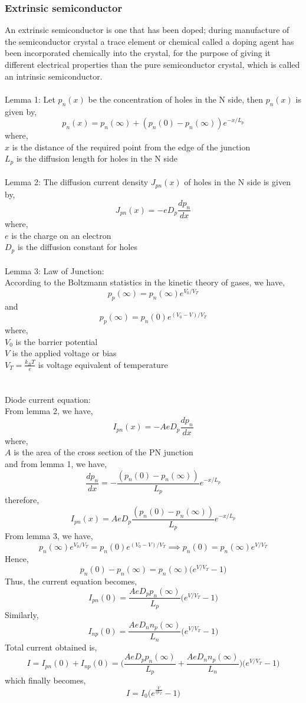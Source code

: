 \documentclass[12pt]{article}
\begin{document}
\subsubsection*{Extrinsic semiconductor}
An extrinsic semiconductor is one that has been doped; during manufacture of the semiconductor crystal a trace element or chemical called a doping agent has been incorporated chemically into the crystal, for the purpose of giving it different electrical properties than the pure semiconductor crystal, which is called an intrinsic semiconductor.\\ \\
Lemma 1: Let $p_n(x)$ be the concentration of holes in the N side, then $p_n(x)$ is given by,
$$p_n(x) = p_n(\infty) + (p_n(0) - p_n(\infty))e^{-x/L_p}$$
where,\\
$x$ is the distance of the required point from the edge of the junction\\
$L_p$ is the diffusion length for holes in the N side\\ \\
Lemma 2: The diffusion current density $J_{pn}(x)$ of holes in the N side is given by,
$$J_{pn}(x) = -eD_p\frac{dp_n}{dx}$$
where,\\
$e$ is the charge on an electron\\
$D_p$ is the diffusion constant for holes\\ \\
Lemma 3: Law of Junction:\\
According to the Boltzmann statistics in the kinetic theory of gases, we have,
$$p_p(\infty) = p_n(\infty)e^{V_0/V_T}$$
and
$$p_p(\infty) = p_n(0)e^{(V_0-V)/V_T}$$
where,\\
$V_0$ is the barrier potential\\
$V$ is the applied voltage or bias\\
$V_T = \frac{k_BT}{e}$ is voltage equivalent of temperature\\
\\ \\
Diode current equation:\\
From lemma 2, we have,
$$I_{pn}(x) = -AeD_p\frac{dp_n}{dx}$$
where,\\
$A$ is the area of the cross section of the PN junction\\
and from lemma 1, we have,
$$\frac{dp_n}{dx} = -\frac{(p_n(0) - p_n(\infty))}{L_p}e^{-x/L_p}$$
therefore,
$$I_{pn}(x) = AeD_p\frac{(p_n(0) - p_n(\infty))}{L_p}e^{-x/L_p}$$
From lemma 3, we have,
$$p_n(\infty)e^{V_0/V_T} = p_n(0)e^{(V_0-V)/V_T} \implies p_n(0) = p_n(\infty)e^{V/V_T}$$
Hence,
$$p_n(0) - p_n(\infty) = p_n(\infty)\Big(e^{V/V_T}-1\Big)$$
Thus, the current equation becomes,
$$I_{pn}(0) = \frac{AeD_pp_n(\infty)}{L_p}\Big(e^{V/V_T}-1\Big)$$
Similarly,
$$I_{np}(0) = \frac{AeD_nn_p(\infty)}{L_n}\Big(e^{V/V_T}-1\Big)$$
Total current obtained is,
$$I=I_{pn}(0)+I_{np}(0) =\Bigg(\frac{AeD_pp_n(\infty)}{L_p}+\frac{AeD_nn_p(\infty)}{L_n}\Bigg)\Big(e^{V/V_T}-1\Big) $$
which finally becomes,
$$I=I_0\Big(e^{\frac{V}{\eta V_T}}-1\Big)$$
\end{document}

